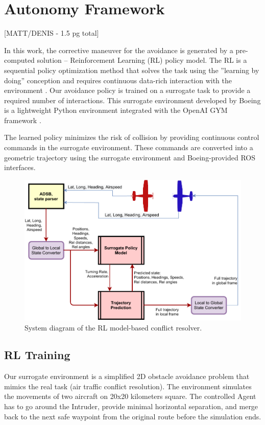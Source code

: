 \section{Autonomy Framework}

[MATT/DENIS - 1.5 pg total]

In this work, the corrective maneuver for the avoidance is generated by a pre-computed solution -- Reinforcement Learning (RL) policy model. 
The RL is a sequential policy optimization method that solves the task using the ''learning by doing'' conception and requires continuous data-rich interaction with the environment \cite{sutton2018reinforcement}. 
Our avoidance policy is trained on a surrogate task to provide a required number of interactions. 
This surrogate environment developed by Boeing is a lightweight Python environment integrated with the OpenAI GYM framework \cite{brockman2016openai}.

The learned policy minimizes the risk of collision by providing continuous control commands in the surrogate environment. These commands are converted into a geometric trajectory using the surrogate environment and Boeing-provided ROS interfaces.

\begin{figure}[h]
	\centering
	\includegraphics[width=\linewidth]{figures/system_overview.pdf}
	\caption{System diagram of the RL model-based conflict resolver.}
	\label{fig:diagram}
\end{figure}

\subsection{RL Training}

Our surrogate environment is a simplified 2D obstacle avoidance problem that mimics the real task (air traffic conflict resolution). 
The environment simulates the movements of two aircraft on 20x20 kilometers square. The controlled Agent has to go around the Intruder, provide minimal horizontal separation, and merge back to the next safe waypoint from the original route before the simulation ends.

